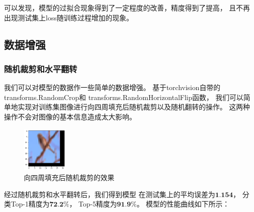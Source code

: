 \documentclass[UTF8]{ctexart}
\begin{document}
可以发现，模型的过拟合现象得到了一定程度的改善，精度得到了提高，
且不再出现测试集上loss随训练过程增加的现象。

\subsection{数据增强}

\subsubsection{随机裁剪和水平翻转}
我们可以对模型的数据作一些简单的数据增强。
基于torchvision自带的transforms.RandomCrop和
transforms.RandomHorizontalFlip函数，
我们可以简单地实现对训练集图像进行向四周填充后随机裁剪以及随机翻转的操作。
这两种操作不会对图像的基本信息造成太大影响。

\begin{figure}[htbp]
    \centering
    \includegraphics[width=0.20\textwidth]{../img/1-4.png}
    \caption{向四周填充后随机裁剪的效果}
\end{figure}

经过随机裁剪和水平翻转后，我们得到模型
在测试集上的平均误差为$\textbf{1.154}$，
分类Top-1精度为$\textbf{72.2\%}$，
Top-5精度为$\textbf{91.9\%}$。
模型的性能曲线如下所示：
\end{document}
